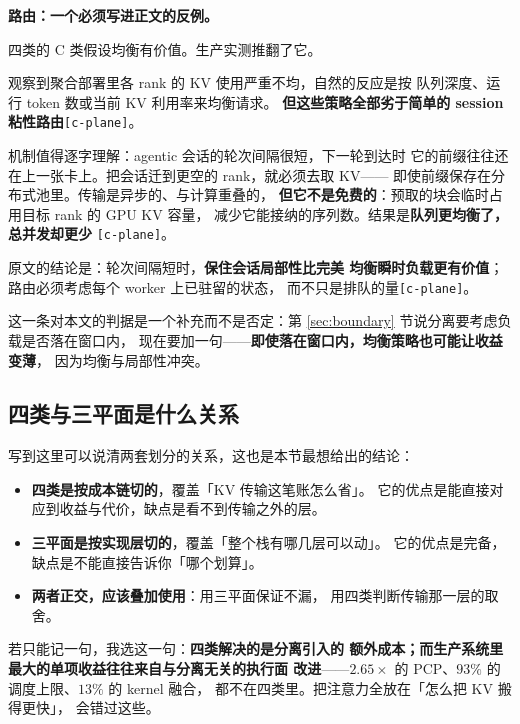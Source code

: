\noindent\textbf{路由：一个必须写进正文的反例。}

\noindent 四类的 C 类假设均衡有价值。生产实测推翻了它。

\noindent 观察到聚合部署里各 rank 的 KV 使用严重不均，自然的反应是按
队列深度、运行 token 数或当前 KV 利用率来均衡请求。
\textbf{但这些策略全部劣于简单的 session 粘性路由}\texttt{[c-plane]}。

\noindent 机制值得逐字理解：agentic 会话的轮次间隔很短，下一轮到达时
它的前缀往往还在上一张卡上。把会话迁到更空的 rank，就必须去取 KV——
即使前缀保存在分布式池里。传输是异步的、与计算重叠的，
\textbf{但它不是免费的}：预取的块会临时占用目标 rank 的 GPU KV 容量，
减少它能接纳的序列数。结果是\textbf{队列更均衡了，总并发却更少}
\texttt{[c-plane]}。

\noindent 原文的结论是：轮次间隔短时，\textbf{保住会话局部性比完美
均衡瞬时负载更有价值}；路由必须考虑每个 worker 上已驻留的状态，
而不只是排队的量\texttt{[c-plane]}。

\noindent 这一条对本文的判据是一个补充而不是否定：第
\ref{sec:boundary} 节说分离要考虑负载是否落在窗口内，
现在要加一句——\textbf{即使落在窗口内，均衡策略也可能让收益变薄}，
因为均衡与局部性冲突。

\subsection{四类与三平面是什么关系}

写到这里可以说清两套划分的关系，这也是本节最想给出的结论：

\begin{itemize}[leftmargin=1.3em,itemsep=1.5pt,topsep=2pt]
  \item \textbf{四类是按成本链切的}，覆盖「KV 传输这笔账怎么省」。
        它的优点是能直接对应到收益与代价，缺点是看不到传输之外的层。
  \item \textbf{三平面是按实现层切的}，覆盖「整个栈有哪几层可以动」。
        它的优点是完备，缺点是不能直接告诉你「哪个划算」。
  \item \textbf{两者正交，应该叠加使用}：用三平面保证不漏，
        用四类判断传输那一层的取舍。
\end{itemize}

\noindent 若只能记一句，我选这一句：\textbf{四类解决的是分离引入的
额外成本；而生产系统里最大的单项收益往往来自与分离无关的执行面
改进}——$2.65\times$ 的 PCP、$93\%$ 的调度上限、$13\%$ 的 kernel 融合，
都不在四类里。把注意力全放在「怎么把 KV 搬得更快」，
会错过这些。

